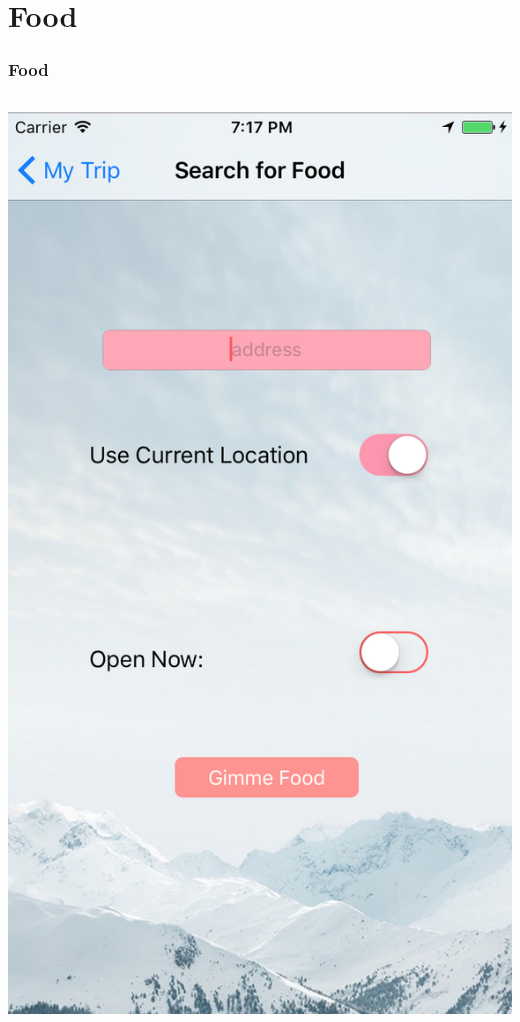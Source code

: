 \documentclass{beamer}
\begin{document}
\section{Food}
\begin{frame}
\frametitle{Food}
\begin{columns}
    \begin{column}{0.3\textwidth}
        \begin{center}
            \includegraphics[scale=0.3]{foodSearch}

\end{center}
\end{column}
\end{columns}
\end{frame}
\end{document}
